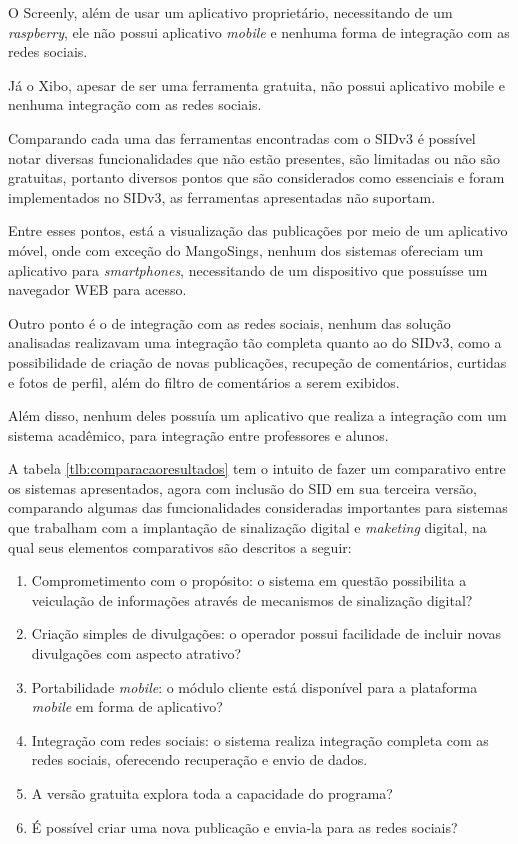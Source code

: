 O Screenly, além de usar um aplicativo proprietário, necessitando de um \textit{raspberry}, ele não possui aplicativo \textit{mobile} e nenhuma forma de integração com as redes sociais.

Já o Xibo, apesar de ser uma ferramenta gratuita, não possui aplicativo mobile e nenhuma integração com as redes sociais. 

Comparando cada uma das ferramentas encontradas com o SIDv3 é possível notar diversas funcionalidades que não estão presentes, são limitadas ou não são gratuitas, portanto diversos pontos que são considerados como essenciais e foram implementados no SIDv3, as ferramentas apresentadas não suportam.

Entre esses pontos, está a visualização das publicações por meio de um aplicativo móvel, onde com exceção do MangoSings, nenhum dos sistemas ofereciam um aplicativo para \textit{smartphones}, necessitando de um dispositivo que possuísse um navegador WEB para acesso.

Outro ponto é o de integração com as redes sociais, nenhum das solução analisadas realizavam uma integração tão completa quanto ao do SIDv3, como a possibilidade de criação de novas publicações, recupeção de comentários, curtidas e fotos de perfil, além do filtro de comentários a serem exibidos. 

Além disso, nenhum deles possuía um aplicativo que realiza a integração com um sistema acadêmico, para integração entre professores e alunos.

A tabela \ref{tlb:comparacaoresultados} tem o intuito de fazer um comparativo entre os sistemas apresentados, agora com inclusão do SID em sua terceira versão, comparando algumas das funcionalidades consideradas importantes para sistemas que trabalham com a implantação de sinalização digital e \textit{maketing} digital, na qual seus elementos comparativos são descritos a seguir:

\begin{enumerate}[label=\Roman*)]
\label{tlb:comparacaoresultados}
	\item Comprometimento com o propósito: o sistema em questão possibilita a veiculação de informações através de mecanismos de sinalização digital?
	\item Criação simples de divulgações: o operador possui facilidade de incluir novas divulgações com aspecto atrativo?
	\item Portabilidade \textit{mobile}: o módulo cliente está disponível para a plataforma \textit{mobile} em forma de aplicativo?
	\item Integração com redes sociais: o sistema realiza integração completa com as redes sociais, oferecendo recuperação e envio de dados.
	\item A versão gratuita explora toda a capacidade do programa?
	\item É possível criar uma nova publicação e envia-la para as redes sociais?
\end{enumerate}

